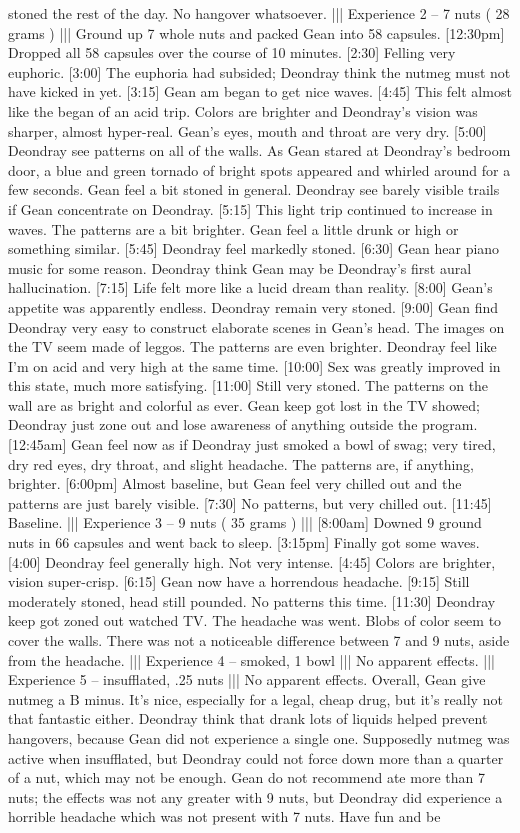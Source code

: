 \documentclass[12pt]{book}
\begin{document}
stoned the rest of the day. No hangover whatsoever. ||| Experience 2 -- 7 nuts ( 28 grams ) ||| Ground up 7 whole nuts and packed Gean into 58 capsules. [12:30pm] Dropped all 58 capsules over the course of 10 minutes. [2:30] Felling very euphoric. [3:00] The euphoria had subsided; Deondray think the nutmeg must not have kicked in yet. [3:15] Gean am began to get nice waves. [4:45] This felt almost like the began of an acid trip. Colors are brighter and Deondray's vision was sharper, almost hyper-real. Gean's eyes, mouth and throat are very dry. [5:00] Deondray see patterns on all of the walls. As Gean stared at Deondray's bedroom door, a blue and green tornado of bright spots appeared and whirled around for a few seconds. Gean feel a bit stoned in general. Deondray see barely visible trails if Gean concentrate on Deondray. [5:15] This light trip continued to increase in waves. The patterns are a bit brighter. Gean feel a little drunk or high or something similar. [5:45] Deondray feel markedly stoned. [6:30] Gean hear piano music for some reason. Deondray think Gean may be Deondray's first aural hallucination. [7:15] Life felt more like a lucid dream than reality. [8:00] Gean's appetite was apparently endless. Deondray remain very stoned. [9:00] Gean find Deondray very easy to construct elaborate scenes in Gean's head. The images on the TV seem made of leggos. The patterns are even brighter. Deondray feel like I'm on acid and very high at the same time. [10:00] Sex was greatly improved in this state, much more satisfying. [11:00] Still very stoned. The patterns on the wall are as bright and colorful as ever. Gean keep got lost in the TV showed; Deondray just zone out and lose awareness of anything outside the program. [12:45am] Gean feel now as if Deondray just smoked a bowl of swag; very tired, dry red eyes, dry throat, and slight headache. The patterns are, if anything, brighter. [6:00pm] Almost baseline, but Gean feel very chilled out and the patterns are just barely visible. [7:30] No patterns, but very chilled out. [11:45] Baseline. ||| Experience 3 -- 9 nuts ( 35 grams ) ||| [8:00am] Downed 9 ground nuts in 66 capsules and went back to sleep. [3:15pm] Finally got some waves. [4:00] Deondray feel generally high. Not very intense. [4:45] Colors are brighter, vision super-crisp. [6:15] Gean now have a horrendous headache. [9:15] Still moderately stoned, head still pounded. No patterns this time. [11:30] Deondray keep got zoned out watched TV. The headache was went. Blobs of color seem to cover the walls. There was not a noticeable difference between 7 and 9 nuts, aside from the headache. ||| Experience 4 -- smoked, 1 bowl ||| No apparent effects. ||| Experience 5 -- insufflated, .25 nuts ||| No apparent effects. Overall, Gean give nutmeg a B minus. It's nice, especially for a legal, cheap drug, but it's really not that fantastic either. Deondray think that drank lots of liquids helped prevent hangovers, because Gean did not experience a single one. Supposedly nutmeg was active when insufflated, but Deondray could not force down more than a quarter of a nut, which may not be enough. Gean do not recommend ate more than 7 nuts; the effects was not any greater with 9 nuts, but Deondray did experience a horrible headache which was not present with 7 nuts. Have fun and be 
\end{document}
